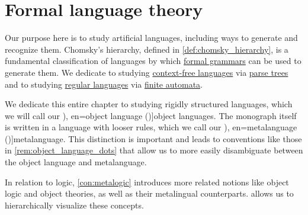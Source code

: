 \chapter{Formal language theory}\label{ch:formal_language_theory}

Our purpose here is to study artificial languages, including ways to generate and recognize them. Chomsky's hierarchy, defined in \cref{def:chomsky_hierarchy}, is a fundamental classification of languages by which \hyperref[def:formal_grammar]{formal grammars} can be used to generate them. We dedicate  to studying \hyperref[def:chomsky_hierarchy/context_free]{context-free languages} via \hyperref[def:parse_tree]{parse trees} and  to studying \hyperref[def:chomsky_hierarchy/regular]{regular languages} via \hyperref[def:finite_automaton]{finite automata}.

\begin{concept}\label{con:metalanguage}
  We dedicate this entire chapter to studying rigidly structured languages, which we will call our \term[ru=предметный язык (\cite[35]{Герасимов2011Вычислимость}), en=object language (\cite[3]{Kleene2002Logic})]{object languages}. The monograph itself is written in a language with looser rules, which we call our \term[ru=метаязык (\cite[35]{Герасимов2011Вычислимость}), en=metalanguage (\cite[3]{Kleene2002Logic})]{metalanguage}. This distinction is important and leads to conventions like those in \cref{rem:object_language_dots} that allow us to more easily disambiguate between the object language and metalanguage.

  In relation to logic, \cref{con:metalogic} introduces more related notions like object logic and object theories, as well as their metalingual counterparts.  allows us to hierarchically visualize these concepts.
\end{concept}

